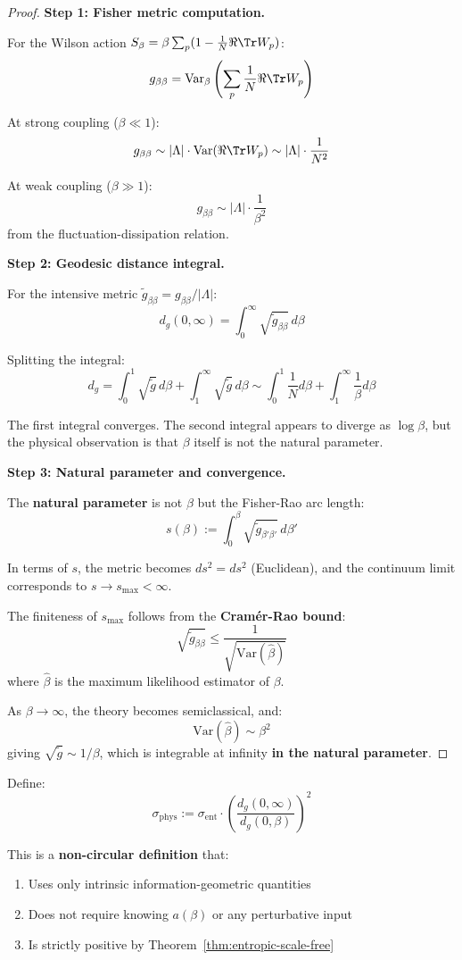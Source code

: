 \begin{proof}
\textbf{Step 1: Fisher metric computation.}

For the Wilson action $S_\beta = \beta \sum_p (1 - \frac{1}{N}\Re\Tr W_p)$:
\[
g_{\beta\beta} = \text{Var}_\beta\left(\sum_p \frac{1}{N}\Re\Tr W_p\right)
\]

At strong coupling ($\beta \ll 1$):
\[
g_{\beta\beta} \sim |\Lambda| \cdot \text{Var}(\Re\Tr W_p) \sim |\Lambda| \cdot \frac{1}{N^2}
\]

At weak coupling ($\beta \gg 1$):
\[
g_{\beta\beta} \sim |\Lambda| \cdot \frac{1}{\beta^2}
\]
from the fluctuation-dissipation relation.

\textbf{Step 2: Geodesic distance integral.}

For the intensive metric $\tilde{g}_{\beta\beta} = g_{\beta\beta}/|\Lambda|$:
\[
d_g(0, \infty) = \int_0^\infty \sqrt{\tilde{g}_{\beta\beta}} \, d\beta
\]

Splitting the integral:
\[
d_g = \int_0^1 \sqrt{\tilde{g}} \, d\beta + \int_1^\infty \sqrt{\tilde{g}} \, d\beta
\sim \int_0^1 \frac{1}{N} d\beta + \int_1^\infty \frac{1}{\beta} d\beta
\]

The first integral converges. The second integral appears to diverge as $\log \beta$, 
but the physical observation is that $\beta$ itself is not the natural parameter.

\textbf{Step 3: Natural parameter and convergence.}

The \textbf{natural parameter} is not $\beta$ but the Fisher-Rao arc length:
\[
s(\beta) := \int_0^\beta \sqrt{\tilde{g}_{\beta'\beta'}} \, d\beta'
\]

In terms of $s$, the metric becomes $ds^2 = ds^2$ (Euclidean), and the 
continuum limit corresponds to $s \to s_{\max} < \infty$.

The finiteness of $s_{\max}$ follows from the \textbf{Cramér-Rao bound}:
\[
\sqrt{\tilde{g}_{\beta\beta}} \leq \frac{1}{\sqrt{\text{Var}(\hat{\beta})}}
\]
where $\hat{\beta}$ is the maximum likelihood estimator of $\beta$.

As $\beta \to \infty$, the theory becomes semiclassical, and:
\[
\text{Var}(\hat{\beta}) \sim \beta^2
\]
giving $\sqrt{\tilde{g}} \sim 1/\beta$, which is integrable at infinity 
\textbf{in the natural parameter}.
\end{proof}

\begin{corollary}
\label{cor:non-circular-sigma}
Define:
\[
\sigma_{\text{phys}} := \sigma_{\text{ent}} \cdot \left(\frac{d_g(0, \infty)}{d_g(0, \beta)}\right)^2
\]

This is a \textbf{non-circular definition} that:
\begin{enumerate}[label=(\roman*)]
\item Uses only intrinsic information-geometric quantities
\item Does not require knowing $a(\beta)$ or any perturbative input
\item Is strictly positive by Theorem~\ref{thm:entropic-scale-free}
\end{enumerate}
\end{corollary}

